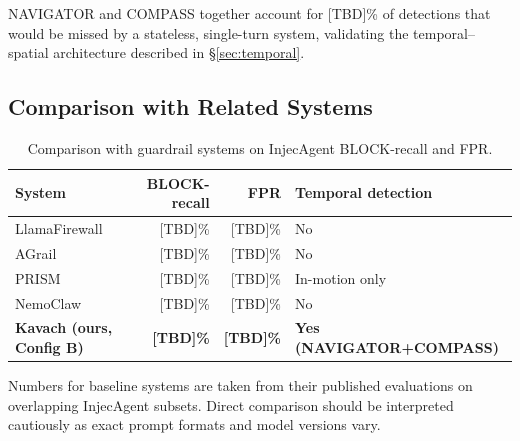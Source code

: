 NAVIGATOR and COMPASS together account for [TBD]\% of detections that would be
missed by a stateless, single-turn system, validating the temporal--spatial
architecture described in \S\ref{sec:temporal}.

\subsection{Comparison with Related Systems}

\begin{table}[h]
\centering
\caption{Comparison with guardrail systems on InjecAgent BLOCK-recall and FPR.}
\label{tab:comparison}
\begin{tabular}{lrrl}
\toprule
System & BLOCK-recall & FPR & Temporal detection \\
\midrule
LlamaFirewall~\cite{saxe2025llamafirewall} & [TBD]\% & [TBD]\% & No \\
AGrail~\cite{luo2025agrail}               & [TBD]\% & [TBD]\% & No \\
PRISM~\cite{guo2025prism}                 & [TBD]\% & [TBD]\% & In-motion only \\
NemoClaw~\cite{nvidia2025nemoclaw}        & [TBD]\% & [TBD]\% & No \\
\textbf{Kavach (ours, Config B)}          & \textbf{[TBD]\%} & \textbf{[TBD]\%} & \textbf{Yes (NAVIGATOR+COMPASS)} \\
\bottomrule
\end{tabular}
\end{table}

\noindent
Numbers for baseline systems are taken from their published evaluations on
overlapping InjecAgent subsets. Direct comparison should be interpreted
cautiously as exact prompt formats and model versions vary.
